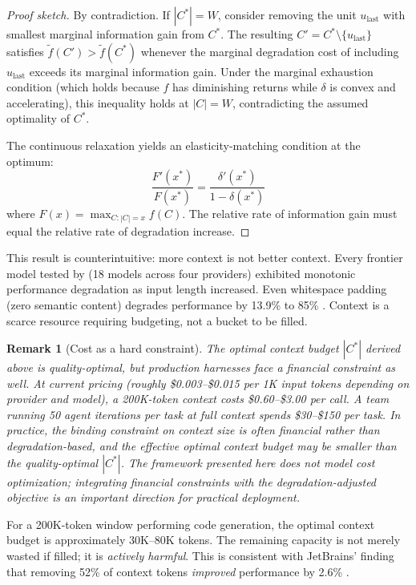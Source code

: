 \documentclass[11pt, a4paper, logo, copyright]{googledeepmind}
\newtheorem*{remark}{Remark}
\begin{document}
\begin{proof}[Proof sketch]
By contradiction. If $|C^*| = W$, consider removing the unit $u_{\text{last}}$ with smallest marginal information gain from $C^*$. The resulting $C' = C^* \setminus \{u_{\text{last}}\}$ satisfies $\tilde{f}(C') > \tilde{f}(C^*)$ whenever the marginal degradation cost of including $u_{\text{last}}$ exceeds its marginal information gain. Under the marginal exhaustion condition (which holds because $f$ has diminishing returns while $\delta$ is convex and accelerating), this inequality holds at $|C| = W$, contradicting the assumed optimality of $C^*$.

The continuous relaxation yields an elasticity-matching condition at the optimum:
\[
    \frac{F'(x^*)}{F(x^*)} = \frac{\delta'(x^*)}{1 - \delta(x^*)}
\]
where $F(x) = \max_{C:|C|=x} f(C)$. The relative rate of information gain must equal the relative rate of degradation increase.
\end{proof}

This result is counterintuitive: more context is not better context. Every frontier model tested by \citet{chroma2025contextrot} (18 models across four providers) exhibited monotonic performance degradation as input length increased. Even whitespace padding (zero semantic content) degrades performance by 13.9\% to 85\% \citep{du2025context}. Context is a scarce resource requiring budgeting, not a bucket to be filled.

\begin{remark}[Cost as a hard constraint]
The optimal context budget $|C^*|$ derived above is quality-optimal, but production harnesses face a financial constraint as well. At current pricing (roughly \$0.003--\$0.015 per 1K input tokens depending on provider and model), a 200K-token context costs \$0.60--\$3.00 per call. A team running 50 agent iterations per task at full context spends \$30--\$150 per task. In practice, the binding constraint on context size is often financial rather than degradation-based, and the effective optimal context budget may be smaller than the quality-optimal $|C^*|$. The framework presented here does not model cost optimization; integrating financial constraints with the degradation-adjusted objective is an important direction for practical deployment.
\end{remark}

For a 200K-token window performing code generation, the optimal context budget is approximately 30K--80K tokens. The remaining capacity is not merely wasted if filled; it is \emph{actively harmful}. This is consistent with JetBrains' finding that removing 52\% of context tokens \emph{improved} performance by 2.6\% \citep{jetbrains2025complexity}.
\end{document}
